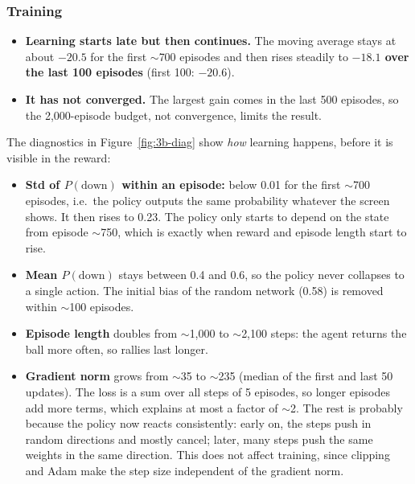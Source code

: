 \subsubsection{Training}


\begin{itemize}
  \item \textbf{Learning starts late but then continues.} The moving average stays at about $-20.5$ for the first $\sim$700 episodes and then rises steadily to \textbf{$-18.1$ over the last 100 episodes} (first 100: $-20.6$).
  \item \textbf{It has not converged.} The largest gain comes in the last 500 episodes, so the 2,000-episode budget, not convergence, limits the result.
\end{itemize}


The diagnostics in Figure~\ref{fig:3b-diag} show \emph{how} learning happens, before it is visible in the reward:
\begin{itemize}
  \item \textbf{Std of $P(\text{down})$ within an episode:} below 0.01 for the first $\sim$700 episodes, i.e.\ the policy outputs the same probability whatever the screen shows. It then rises to 0.23. The policy only starts to depend on the state from episode $\sim$750, which is exactly when reward and episode length start to rise.
  \item \textbf{Mean $P(\text{down})$} stays between 0.4 and 0.6, so the policy never collapses to a single action. The initial bias of the random network (0.58) is removed within $\sim$100 episodes.
  \item \textbf{Episode length} doubles from $\sim$1,000 to $\sim$2,100 steps: the agent returns the ball more often, so rallies last longer.
  \item \textbf{Gradient norm} grows from $\sim$35 to $\sim$235 (median of the first and last 50 updates). The loss is a sum over all steps of 5 episodes, so longer episodes add more terms, which explains at most a factor of $\sim$2. The rest is probably because the policy now reacts consistently: early on, the steps push in random directions and mostly cancel; later, many steps push the same weights in the same direction. This does not affect training, since clipping and Adam make the step size independent of the gradient norm.
\end{itemize}


